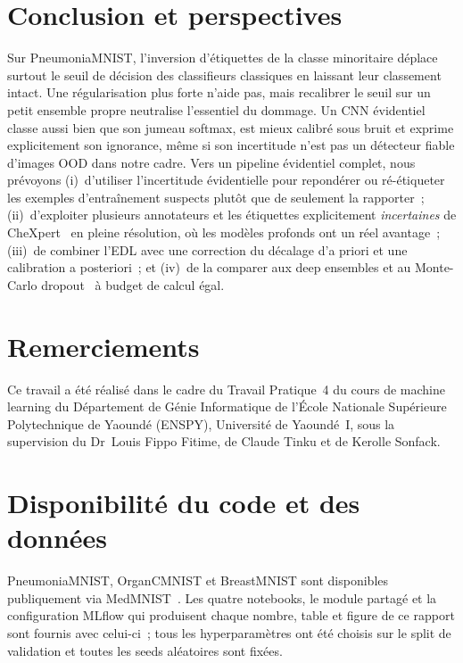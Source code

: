 \documentclass[11pt,a4paper]{article}
\begin{document}
\section{Conclusion et perspectives}
Sur PneumoniaMNIST, l'inversion d'étiquettes de la classe minoritaire déplace surtout le seuil de décision des
classifieurs classiques en laissant leur classement intact. Une régularisation plus forte n'aide pas, mais recalibrer le
seuil sur un petit ensemble propre neutralise l'essentiel du dommage. Un CNN évidentiel classe aussi bien que son jumeau
softmax, est mieux calibré sous bruit et exprime explicitement son ignorance, même si son incertitude n'est pas un
détecteur fiable d'images OOD dans notre cadre. Vers un pipeline évidentiel complet, nous prévoyons
(i)~d'utiliser l'incertitude évidentielle pour repondérer ou ré-étiqueter les exemples d'entraînement suspects plutôt que
de seulement la rapporter~; (ii)~d'exploiter plusieurs annotateurs et les étiquettes explicitement \emph{incertaines} de
CheXpert~\cite{irvin2019chexpert} en pleine résolution, où les modèles profonds ont un réel avantage~; (iii)~de combiner
l'EDL avec une correction du décalage d'a priori et une calibration a posteriori~; et (iv)~de la comparer aux deep
ensembles et au Monte-Carlo dropout~\cite{lakshminarayanan2017simple,gal2016dropout} à budget de calcul égal.

\section*{Remerciements}
Ce travail a été réalisé dans le cadre du Travail Pratique~4 du cours de machine learning du Département de
Génie Informatique de l'École Nationale Supérieure Polytechnique de Yaoundé (ENSPY), Université de Yaoundé~I, sous la
supervision du Dr~Louis Fippo Fitime, de Claude Tinku et de Kerolle Sonfack.

\section*{Disponibilité du code et des données}
PneumoniaMNIST, OrganCMNIST et BreastMNIST sont disponibles publiquement via MedMNIST~\cite{yang2023medmnist}. Les quatre
notebooks, le module partagé et la configuration MLflow qui produisent chaque nombre, table et figure de ce rapport sont
fournis avec celui-ci~; tous les hyperparamètres ont été choisis sur le split de validation et toutes les seeds
aléatoires sont fixées.
\end{document}
